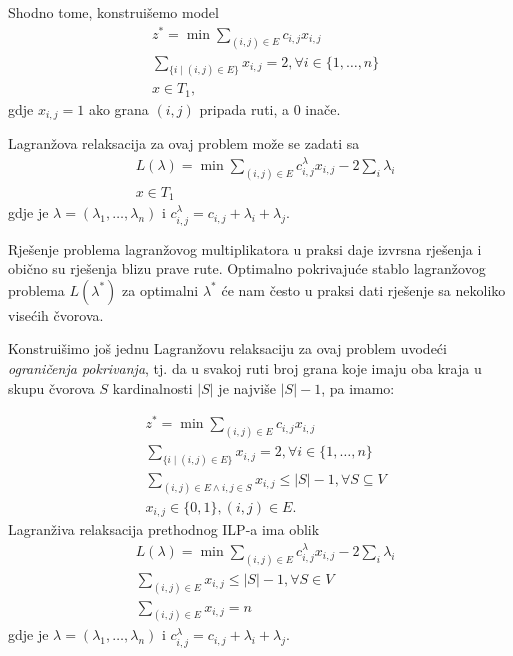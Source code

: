 \documentclass[a4paper, utf8, 11pt, colorlinks]{book}
\begin{document}
Shodno tome, konstruišemo model
\begin{align*}
    &z^* = \min \sum_{(i,j)\in E} c_{i,j} x_{i,j}\\
    & \sum_{ \{ i \mid (i,j) \in E \} } x_{i,j} = 2, \forall i \in \{1,\ldots, n \} \\
    & x \in T_1,
\end{align*}
gdje $x_{i,j} = 1$ ako grana $(i,j)$ pripada ruti, a 0 inače.

Lagranžova relaksacija za ovaj problem može se zadati sa 
\begin{align*}
     &L(\lambda) = \min \sum_{(i,j)\in E} c^\lambda_{i,j} x_{i,j} - 2 \sum_{i} \lambda_i \\
     & x \in T_1
\end{align*}
gdje je $\lambda=(\lambda_1, \ldots, \lambda_n)$ i $c^\lambda_{i,j} = c_{i,j} + \lambda_i + \lambda_j$. 

Rješenje problema lagranžovog multiplikatora u praksi daje izvrsna rješenja i obično su rješenja blizu prave rute. Optimalno pokrivajuće stablo lagranžovog problema $L(\lambda^*)$ za optimalni $\lambda^*$ će nam često u praksi dati rješenje sa  nekoliko visećih čvorova. 

Konstruišimo još jednu Lagranžovu relaksaciju za ovaj problem uvodeći \emph{ograničenja pokrivanja}, tj. da u svakoj ruti broj grana koje imaju oba kraja u skupu čvorova $S$ kardinalnosti $|S|$ je najviše $|S|-1$, pa imamo: 

\begin{align*}
     & z^* = \min \sum_{(i,j)\in E} c_{i,j} x_{i,j} \\
     & \sum_{ \{ i \mid (i,j) \in E \} } x_{i,j} = 2, \forall i \in \{1,\ldots, n \} \\
     & \sum_{(i,j) \in E  \wedge i,j \in S} x_{i,j} \leq |S|-1, \forall S \subseteq V \\
     & x_{i,j} \in \{0, 1 \}, (i,j)\in E.
\end{align*}
Lagranživa relaksacija prethodnog ILP-a ima oblik 
\begin{align*}
 &L(\lambda) = \min \sum_{(i,j)\in E} c^\lambda_{i,j} x_{i,j} - 2 \sum_{i} \lambda_i \\
 & \sum_{(i,j) \in E} x_{i,j} \leq |S|-1, \forall S \in V \\
 & \sum_{(i,j) \in E} x_{i,j} = n
\end{align*}
gdje je $\lambda=(\lambda_1, \ldots, \lambda_n)$ i $c^\lambda_{i,j} = c_{i,j} + \lambda_i + \lambda_j$. 

\end{document}
